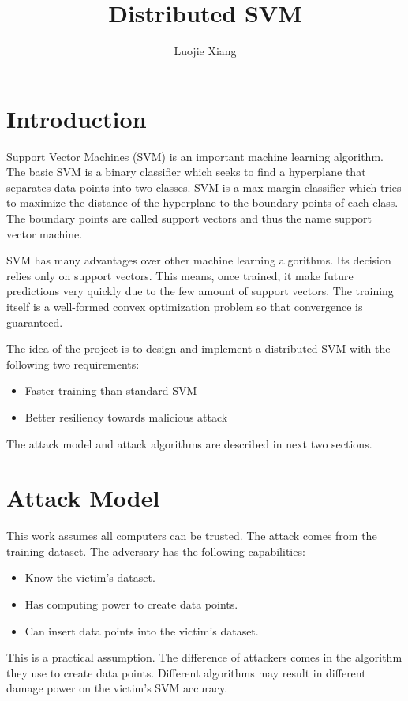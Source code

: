 \documentclass[10pt,conference,compsocconf,letterpaper]{IEEEtran}
\title{Distributed SVM}
\author{Luojie Xiang}
\date{}
\begin{document}
\maketitle{}
\section{Introduction}

Support Vector Machines (SVM) is an important machine learning algorithm. The basic SVM is a binary classifier which seeks to find a hyperplane that separates data points into two classes. SVM is a max-margin classifier which tries to maximize the distance of the hyperplane to the boundary points of each class. The boundary points are called support vectors and thus the name support vector machine. 

SVM has many advantages over other machine learning algorithms. Its decision relies only on support vectors. This means, once trained, it make future predictions very quickly due to the few amount of support vectors. The training itself is a well-formed convex optimization problem so that convergence is guaranteed. 

The idea of the project is to design and implement a distributed SVM with the following two requirements:

\begin{itemize}
\item Faster training than standard SVM
\item Better resiliency towards malicious attack
\end{itemize}

The attack model and attack algorithms are described in next two sections.

\section{Attack Model}

This work assumes all computers can be trusted. The attack comes from the training dataset. The adversary has the following capabilities:

\begin{itemize}
\item Know the victim's dataset. 
\item Has computing power to create data points.
\item Can insert data points into the victim's dataset.
\end{itemize}

This is a practical assumption. The difference of attackers comes in the algorithm they use to create data points. Different algorithms may result in different damage power on the victim's SVM accuracy.
\end{document}
